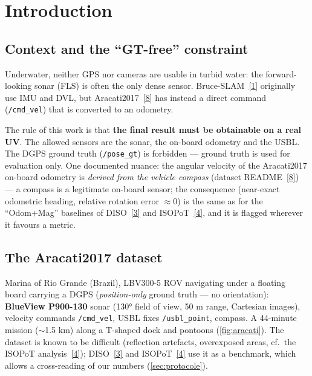\section{Introduction}
\label{sec:intro}

\subsection{Context and the ``GT-free'' constraint}

Underwater, neither GPS nor cameras are usable in turbid water: the forward-looking
sonar (FLS) is often the only dense sensor. Bruce-SLAM~\hyperref[bib:bruceslam]{[1]} originally use IMU and DVL, but Aracati2017~\hyperref[bib:aracati]{[8]} has instead a direct command (\texttt{/cmd\_vel}) that is converted to an odometry.

The rule of this work is that \textbf{the final result must be obtainable on a real
UV}. The allowed sensors are the sonar, the on-board odometry and the USBL. The DGPS ground truth
(\texttt{/pose\_gt}) is forbidden — ground truth is
used for evaluation only. One documented nuance: the angular velocity of the
Aracati2017 on-board odometry is \emph{derived from the vehicle compass} (dataset
README~\hyperref[bib:aracati]{[8]}) — a compass is a legitimate on-board sensor; the consequence (near-exact
odometric heading, relative rotation error $\approx 0$) is the same as for the
``Odom+Mag'' baselines of DISO~\hyperref[bib:diso]{[3]} and ISOPoT~\hyperref[bib:isopot]{[4]}, and it is flagged wherever it
favours a metric.

\subsection{The Aracati2017 dataset}

Marina of Rio Grande (Brazil), LBV300-5 ROV navigating under a floating board
carrying a DGPS (\emph{position-only} ground truth — no orientation): 
\textbf{BlueView P900-130} sonar (130° field of view, 50 m range, Cartesian images),
velocity commands \texttt{/cmd\_vel}, USBL fixes \texttt{/usbl\_point}, compass.
A 44-minute mission ($\sim$1.5 km) along a T-shaped dock and pontoons (\autoref{fig:aracati}). The dataset is
known to be difficult (reflection artefacts, overexposed areas, cf.\ the ISOPoT
analysis~\hyperref[bib:isopot]{[4]}); DISO~\hyperref[bib:diso]{[3]} and ISOPoT~\hyperref[bib:isopot]{[4]} use it as a benchmark, which allows a
cross-reading of our numbers (\autoref{sec:protocole}).

